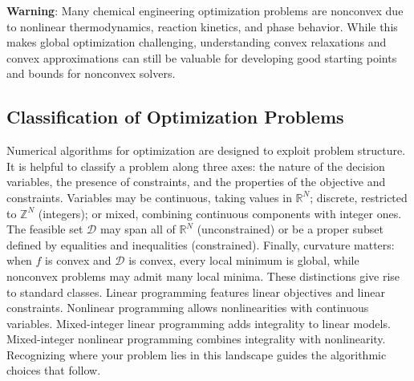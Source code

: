 \begin{warningBox}
    \textbf{Warning}: Many chemical engineering optimization problems are nonconvex due to nonlinear thermodynamics, reaction kinetics, and phase behavior. While this makes global optimization challenging, understanding convex relaxations and convex approximations can still be valuable for developing good starting points and bounds for nonconvex solvers.
\end{warningBox}

\subsection{Classification of Optimization Problems}
Numerical algorithms for optimization are designed to exploit problem structure. It is helpful to classify a problem along three axes: the nature of the decision variables, the presence of constraints, and the properties of the objective and constraints. Variables may be continuous, taking values in $\mathbb{R}^N$; discrete, restricted to $\mathbb{Z}^N$ (integers); or mixed, combining continuous components with integer ones. The feasible set $\mathcal{D}$ may span all of $\mathbb{R}^N$ (unconstrained) or be a proper subset defined by equalities and inequalities (constrained). Finally, curvature matters: when $f$ is convex and $\mathcal{D}$ is convex, every local minimum is global, while nonconvex problems may admit many local minima. These distinctions give rise to standard classes. Linear programming features linear objectives and linear constraints. Nonlinear programming allows nonlinearities with continuous variables. Mixed-integer linear programming adds integrality to linear models. Mixed-integer nonlinear programming combines integrality with nonlinearity. Recognizing where your problem lies in this landscape guides the algorithmic choices that follow.

